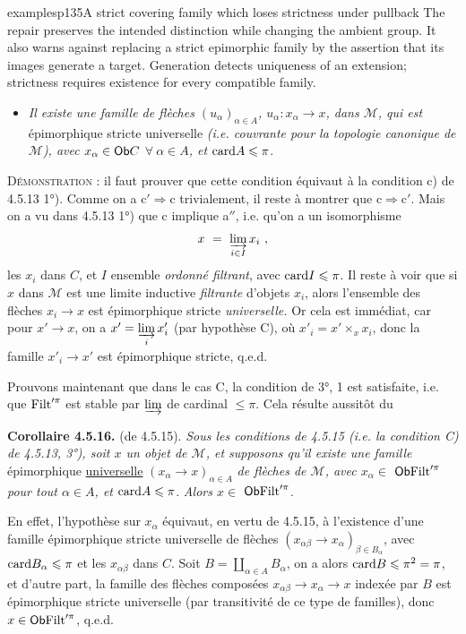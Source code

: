 \begin{dcomment}{examples}{p135}{A strict covering family which loses strictness under pullback}
The repair preserves the intended distinction while changing the ambient group. It also warns against replacing a strict epimorphic family by the assertion that its images generate a target. Generation detects uniqueness of an extension; strictness requires existence for every compatible family.
\end{dcomment}


\begin{itemize}
\item[\textit{c$'$)}] \textit{Il existe une famille de flèches $(u_{\alpha})_{\alpha\in A}$, $u_{\alpha} : x_{\alpha} \longrightarrow x$, dans $\mathcal{M}$, qui est} épimorphique stricte universelle \textit{(i.e. couvrante pour la topologie canonique de $\mathcal{M}$), avec $x_{\alpha} \in \mathsf{Ob} C$ $\forall\ \alpha \in A$, et} $\mathrm{card} A \leqslant \pi$.
\end{itemize}
\textsc{Démonstration} : il faut prouver que cette condition équivaut à la condition c) de 4.5.13 1°). Comme on a $\mathrm{c}' \Longrightarrow \mathrm{c}$ trivialement, il reste à montrer que $\mathrm{c} \Longrightarrow \mathrm{c}'$. Mais on a vu dans 4.5.13 1°) que c implique a$''$, i.e. qu'on a un isomorphisme
\[ x \ = \ \varinjlim_{i\in I} x_i \ , \]
les $x_i$ dans $C$, et $I$ ensemble \textit{ordonné filtrant}, avec $\mathrm{card} I \leqslant \pi$. Il reste à voir que si $x$ dans $\mathcal{M}$ est une limite inductive \textit{filtrante} d'objets $x_i$, alors l'ensemble des flèches $x_i \longrightarrow x$ est épimorphique stricte \textit{universelle.} Or cela est immédiat, car pour $x' \longrightarrow x$, on a $x' = \varinjlim\limits_{i} x'_i$ (par hypothèse C), où $x'_i = x' \times_x x_i$, donc la famille $x'_i \longrightarrow x'$ est épimorphique stricte, q.e.d.

Prouvons maintenant que dans le cas C, la condition de 3°, 1 est satisfaite, i.e. que $\mathrm{Filt}'^{\pi}$ est stable par $\varinjlim$ de cardinal $\leqslant \pi$. Cela
résulte aussitôt du

\textbf{Corollaire 4.5.16.} (de 4.5.15). \textit{Sous les conditions de 4.5.15 (i.e. la condition C) de 4.5.13, 3°), soit $x$ un objet de $\mathcal{M}$, et supposons qu'il existe une famille} épimorphique \underline{universelle} $(x_{\alpha} \longrightarrow x)_{\alpha\in A}$ \textit{de flèches de $\mathcal{M}$, avec $x_{\alpha} \in$} $\mathsf{Ob} \mathrm{Filt}'^{\pi}$ \textit{pour tout $\alpha \in A$, et} $\mathrm{card} A \leqslant \pi$. \textit{Alors $x \in$} $\mathsf{Ob} \mathrm{Filt}'^{\pi}$.

En effet, l'hypothèse sur $x_{\alpha}$ équivaut, en vertu de 4.5.15, à l'existence d'une famille épimorphique stricte universelle de flèches $(x_{\alpha\beta} \longrightarrow x_{\alpha})_{\beta\in B_{\alpha}}$, avec $\mathrm{card} B_{\alpha} \leqslant \pi$ et les $x_{\alpha\beta}$ dans $C$. Soit $B = \coprod_{\alpha\in A} B_{\alpha}$, on a alors $\mathrm{card} B \leqslant \pi^2 = \pi$, et d'autre part, la famille des flèches composées $x_{\alpha\beta} \longrightarrow x_{\alpha} \longrightarrow x$ indexée par $B$ est épimorphique stricte universelle (par transitivité de ce type de familles), donc $x \in \mathsf{Ob} \mathrm{Filt}'^{\pi}$, q.e.d.

